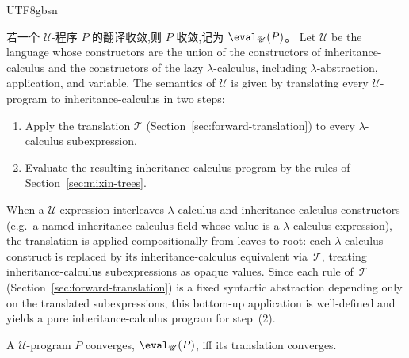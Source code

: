 \begin{CJK*}{UTF8}{gbsn}
\begin{definition}
  若一个 $\mathscr{U}$-程序 $P$ 的翻译收敛,则 $P$ 收敛,记为 $\eval_{\mathscr{U}}(P)$。
  \else
  Let $\mathscr{U}$ be the language whose constructors are
  the union of the constructors of inheritance-calculus and
  the constructors of the lazy $\lambda$-calculus,
  including $\lambda$-abstraction, application, and variable.
  The semantics of $\mathscr{U}$ is given by translating
  every $\mathscr{U}$-program to inheritance-calculus in
  two steps:
  \begin{enumerate}
    \item Apply the translation $\mathcal{T}$
      (Section~\ref{sec:forward-translation}) to every
      $\lambda$-calculus subexpression.
    \item Evaluate the resulting inheritance-calculus
      program by the rules of
      Section~\ref{sec:mixin-trees}.
  \end{enumerate}
  When a $\mathscr{U}$-expression interleaves
  $\lambda$-calculus and inheritance-calculus constructors
  (e.g.\ a named inheritance-calculus field whose value is a
  $\lambda$-calculus expression), the translation is
  applied compositionally from leaves to root: each
  $\lambda$-calculus construct is replaced by its
  inheritance-calculus equivalent via~$\mathcal{T}$,
  treating inheritance-calculus subexpressions as opaque
  values.
  Since each rule of~$\mathcal{T}$
  (Section~\ref{sec:forward-translation}) is a fixed
  syntactic abstraction depending only on the translated
  subexpressions, this bottom-up application is
  well-defined and yields a pure inheritance-calculus
  program for step~(2).

  A $\mathscr{U}$-program $P$ converges,
  $\eval_{\mathscr{U}}(P)$, iff its translation
  converges.
  \fi
\end{definition}


\end{CJK*}
